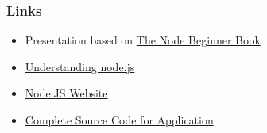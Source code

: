 \documentclass[ignorenonframetext,]{beamer}
\begin{document}
\begin{frame}\frametitle{Links}

\begin{itemize}
\item
  Presentation based on \href{http://www.nodebeginner.org/}{The Node
  Beginner Book}
\item
  \href{http://debuggable.com/posts/understanding-node-js:4bd98440-45e4-4a9a-8ef7-0f7ecbdd56cb}{Understanding
  node.js}
\item
  \href{http://nodejs.org}{Node.JS Website}
\item
  \href{http://github.com/ManuelKiessling/NodeBeginnerBook/tree/master/code/application}{Complete
  Source Code for Application}
\end{itemize}
\end{frame}
\end{document}

